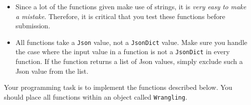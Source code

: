 \begin{itemize}
\item Since a lot of the functions given make use of strings, it is
\textit{very easy to make a mistake}. Therefore, it is critical that you test
these functions before submission.

\item All functions take a \texttt{Json} value, not a \texttt{JsonDict} value.
Make sure you handle the case where the input value in a function is not
a \texttt{JsonDict} in every function. If the function returns a list of
Json values, simply exclude such a Json value from the list.
\end{itemize}

Your programming task is to implement the functions described below. You should
place all functions within an object called \texttt{Wrangling}.

